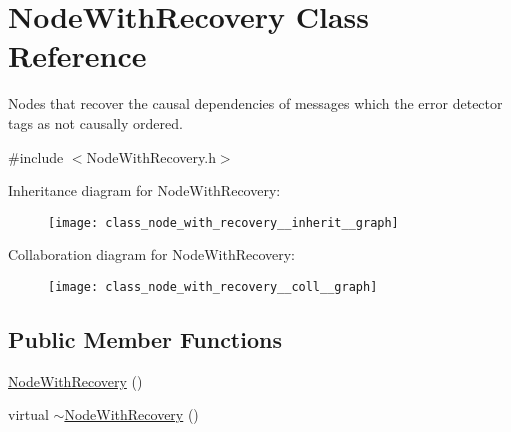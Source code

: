 \hypertarget{class_node_with_recovery}{}\section{Node\+With\+Recovery Class Reference}
\label{class_node_with_recovery}


Nodes that recover the causal dependencies of messages which the error detector tags as not causally ordered.  




{\ttfamily \#include $<$Node\+With\+Recovery.\+h$>$}



Inheritance diagram for Node\+With\+Recovery\+:\nopagebreak
\begin{figure}[H]
\begin{center}
\leavevmode
\texttt{[image: class\_node\_with\_recovery\_\_inherit\_\_graph]}
\end{center}
\end{figure}


Collaboration diagram for Node\+With\+Recovery\+:
\nopagebreak
\begin{figure}[H]
\begin{center}
\leavevmode
\texttt{[image: class\_node\_with\_recovery\_\_coll\_\_graph]}
\end{center}
\end{figure}
\subsection*{Public Member Functions}
\begin{DoxyCompactItemize}
\item 
\hyperlink{class_node_with_recovery_aed1d9b2cfa7729902c90c103ab3075ff}{Node\+With\+Recovery} ()
\item 
virtual \hyperlink{class_node_with_recovery_a5cb1367a800cf960b96c9011ab94a616}{$\sim$\+Node\+With\+Recovery} ()
\end{DoxyCompactItemize}
